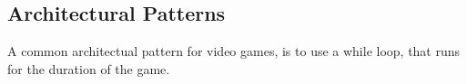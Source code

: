 \subsection{Architectural Patterns}

A common architectual pattern for video games, is to use a while loop, that runs for the duration of the game. 
